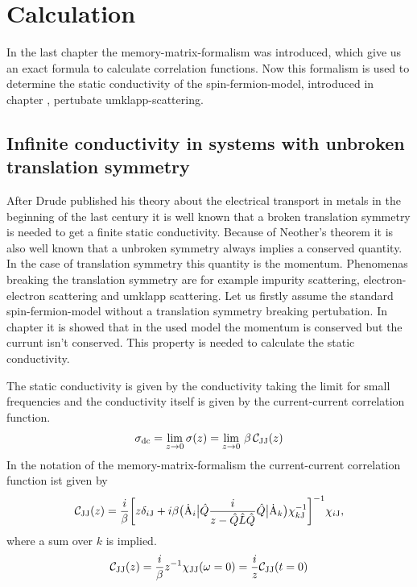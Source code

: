 \chapter{Calculation}
\label{ch: calculation}

In the last chapter the memory-matrix-formalism was introduced, which give us an exact formula to calculate correlation functions.
Now this formalism is used to determine the static conductivity of the spin-fermion-model, introduced in chapter , pertubate umklapp-scattering.


\section{Infinite conductivity in systems with unbroken translation symmetry}
\label{sec: Infinite conductivity in a system with unbroken translation symmetry}
%
%
After Drude published his theory about the electrical transport in metals \cite{Drude} in the beginning of the last century it is well known that a broken translation symmetry is needed to get a finite static conductivity.
Because of Neother's theorem it is also well known that a unbroken symmetry always implies a conserved quantity.
In the case of translation symmetry this quantity is the momentum.
Phenomenas breaking the translation symmetry are for example impurity scattering, electron-electron scattering and umklapp scattering.
Let us firstly assume the standard spin-fermion-model without a translation symmetry breaking pertubation.
In chapter  it is showed that in the used model the momentum is conserved but the currunt isn't conserved.
This property is needed to calculate the static conductivity.

The static conductivity is given by the conductivity taking the limit for small frequencies and the conductivity itself is given by the current-current correlation function.
%
\begin{align}
	\sigma_{\mathrm{dc}} = \lim\limits_{z \to 0} \sigma(z) = \lim\limits_{z \to 0}\, \beta\,\mathcal{C}_{\mathrm{JJ}}(z)
\end{align}
%
In the notation of the memory-matrix-formalism the current-current correlation function ist given by
%
\begin{align}
	\mathcal{C}_{\mathrm{JJ}}(z) = 
		\frac{i}{\beta} \bigg[ 
			z \delta_{i\mathrm{J}} 
			+ 
			i \beta 
			\big({\dot{\mathrm{A}}_{i}}\big| 
			\hat{Q} \frac{i}{z - \hat{Q} \hat{L} \hat{Q}} \hat{Q} 
			\big|{\dot{\mathrm{A}}_{k}}\big)
			\chi_{k\mathrm{J}}^{-1}
		\bigg]^{-1}
		\chi_{i\mathrm{J}},
\end{align}
%
where a sum over $k$ is implied.
%
\begin{align}
	\mathcal{C}_{\mathrm{JJ}}(z) = \frac{i}{\beta} z^{-1} \chi_{\mathrm{JJ}}(\omega=0) = \frac{i}{z} \mathcal{C}_{\mathrm{JJ}}(t=0)
\end{align}
%

